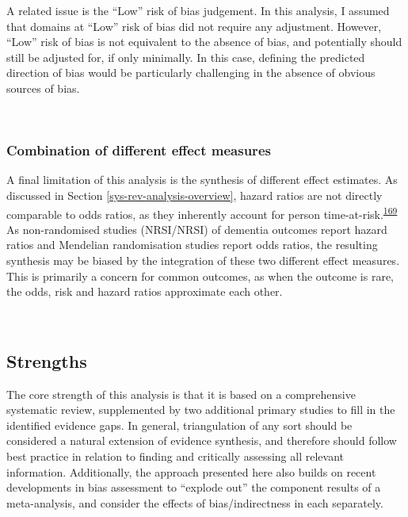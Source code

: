\documentclass[a4paper, twoside]{templates/ociamthesis}
\begin{document}
A related issue is the ``Low'' risk of bias judgement. In this analysis, I assumed that domains at ``Low'' risk of bias did not require any adjustment. However, ``Low'' risk of bias is not equivalent to the absence of bias, and potentially should still be adjusted for, if only minimally. In this case, defining the predicted direction of bias would be particularly challenging in the absence of obvious sources of bias.

~

\hypertarget{combination-of-different-effect-measures}{%
\subsubsection{Combination of different effect measures}\label{combination-of-different-effect-measures}}

A final limitation of this analysis is the synthesis of different effect estimates. As discussed in Section \ref{sys-rev-analysis-overview}, hazard ratios are not directly comparable to odds ratios, as they inherently account for person time-at-risk.\textsuperscript{\protect\hyperlink{ref-mckenzie2019}{169}} As non-randomised studies (NRSI/NRSI) of dementia outcomes report hazard ratios and Mendelian randomisation studies report odds ratios, the resulting synthesis may be biased by the integration of these two different effect measures. This is primarily a concern for common outcomes, as when the outcome is rare, the odds, risk and hazard ratios approximate each other.

~

\hypertarget{strengths-2}{%
\subsection{Strengths}\label{strengths-2}}

The core strength of this analysis is that it is based on a comprehensive systematic review, supplemented by two additional primary studies to fill in the identified evidence gaps. In general, triangulation of any sort should be considered a natural extension of evidence synthesis, and therefore should follow best practice in relation to finding and critically assessing all relevant information. Additionally, the approach presented here also builds on recent developments in bias assessment to ``explode out'' the component results of a meta-analysis, and consider the effects of bias/indirectness in each separately.
\end{document}
